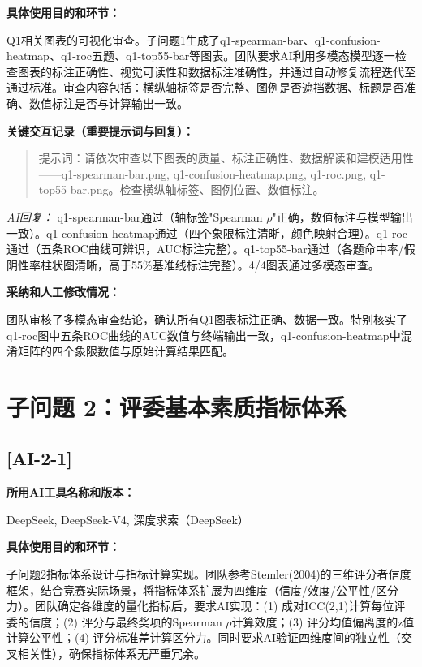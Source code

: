 \documentclass[12pt,a4paper]{ctexart}
\begin{document}
\textbf{具体使用目的和环节：}\par
Q1相关图表的可视化审查。子问题1生成了q1-spearman-bar、q1-confusion-heatmap、q1-roc五题、q1-top55-bar等图表。团队要求AI利用多模态模型逐一检查图表的标注正确性、视觉可读性和数据标注准确性，并通过自动修复流程迭代至通过标准。审查内容包括：横纵轴标签是否完整、图例是否遮挡数据、标题是否准确、数值标注是否与计算输出一致。

\textbf{关键交互记录（重要提示词与回复）：}\par

\begin{quote}
提示词：请依次审查以下图表的质量、标注正确性、数据解读和建模适用性——q1-spearman-bar.png, q1-confusion-heatmap.png, q1-roc.png, q1-top55-bar.png。检查横纵轴标签、图例位置、数值标注。
\end{quote}

\textit{AI回复：} q1-spearman-bar通过（轴标签"Spearman $\rho$"正确，数值标注与模型输出一致）。q1-confusion-heatmap通过（四个象限标注清晰，颜色映射合理）。q1-roc通过（五条ROC曲线可辨识，AUC标注完整）。q1-top55-bar通过（各题命中率/假阴性率柱状图清晰，高于55\%基准线标注完整）。4/4图表通过多模态审查。

\textbf{采纳和人工修改情况：}\par
团队审核了多模态审查结论，确认所有Q1图表标注正确、数据一致。特别核实了q1-roc图中五条ROC曲线的AUC数值与终端输出一致，q1-confusion-heatmap中混淆矩阵的四个象限数值与原始计算结果匹配。

\section*{子问题 2：评委基本素质指标体系}

\subsection*{[AI-2-1]}

\textbf{所用AI工具名称和版本：}\par
DeepSeek, DeepSeek-V4, 深度求索（DeepSeek）

\textbf{具体使用目的和环节：}\par
子问题2指标体系设计与指标计算实现。团队参考Stemler(2004)的三维评分者信度框架，结合竞赛实际场景，将指标体系扩展为四维度（信度/效度/公平性/区分力）。团队确定各维度的量化指标后，要求AI实现：(1) 成对ICC(2,1)计算每位评委的信度；(2) 评分与最终奖项的Spearman $\rho$计算效度；(3) 评分均值偏离度的z值计算公平性；(4) 评分标准差计算区分力。同时要求AI验证四维度间的独立性（交叉相关性），确保指标体系无严重冗余。
\end{document}
